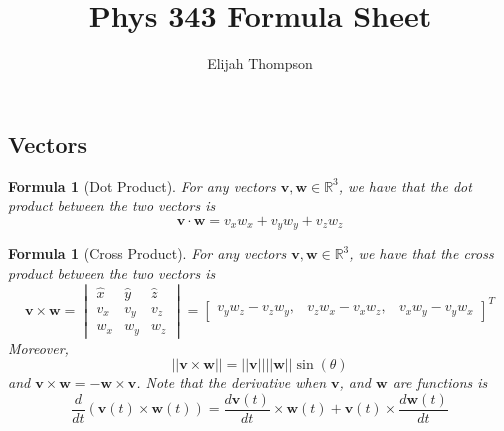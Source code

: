 \documentclass[12pt]{article}
\newtheorem{for}[thm]{Formula}
\theoremstyle{definition}
\theoremstyle{remark}
\numberwithin{equation}{section}
\newcommand\R{\mathbb R}    %
\newcommand\B[1]{\textbf{#1}}
\begin{document}

\title{Phys 343 Formula Sheet}
\author{Elijah Thompson}
\maketitle




\subsection{Vectors}


\begin{for}[Dot Product]
        For any vectors $\B{v},\B{w} \in \R^3$, we have that the dot product between the two vectors is 
        \begin{equation}
                \B{v}\cdot\B{w} = v_xw_x+v_yw_y+v_zw_z
        \end{equation}
\end{for}


\vspace{15pt}

\begin{for}[Cross Product]
        For any vectors $\B{v},\B{w} \in \R^3$, we have that the cross product between the two vectors is 
        \begin{equation}
                \B{v}\times\B{w} = \begin{vmatrix} \hat{x} & \hat{y} & \hat{z} \\
                        v_x & v_y & v_z \\
                        w_x & w_y & w_z 
                \end{vmatrix} = 
                        \begin{bmatrix} v_yw_z - v_zw_y, & v_zw_x - v_xw_z, & v_xw_y - v_yw_x
                \end{bmatrix}^T
        \end{equation}
        Moreover, \begin{equation}
                ||\B{v}\times\B{w}|| = ||\B{v}||||\B{w}||\sin(\theta)
        \end{equation}
        and $\B{v}\times \B{w} = -\B{w} \times \B{v}$. Note that the derivative when $\B{v}$, and $\B{w}$ are functions is \begin{equation}
                \frac{d}{dt}(\B{v}(t)\times \B{w}(t)) = \frac{d\B{v}(t)}{dt}\times\B{w}(t) + \B{v}(t)\times \frac{d\B{w}(t)}{dt}
        \end{equation}
\end{for}
\end{document}
